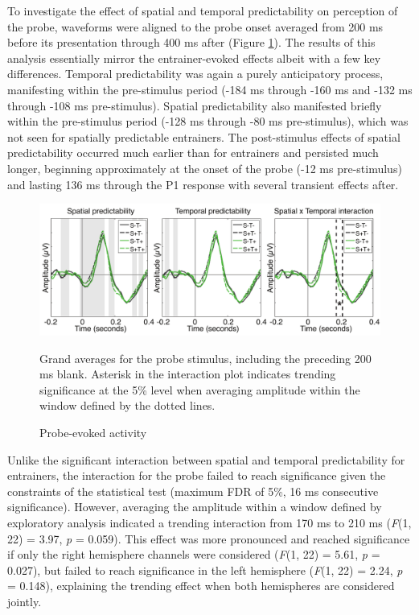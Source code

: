 \documentclass[dwyatte_dissertation.tex]{subfiles}
\begin{document}
To investigate the effect of spatial and temporal predictability on perception of the probe, waveforms were aligned to the probe onset averaged from 200 ms before its presentation through 400 ms after (Figure \ref{fig:pleast_probe_tla}). The results of this analysis essentially mirror the entrainer-evoked effects albeit with a few key differences. Temporal predictability was again a purely anticipatory process, manifesting within the pre-stimulus period (-184 ms through -160 ms and -132 ms through -108 ms pre-stimulus). Spatial predictability also manifested briefly within the pre-stimulus period (-128 ms through -80 ms pre-stimulus), which was not seen for spatially predictable entrainers. The post-stimulus effects of spatial predictability occurred much earlier than for entrainers and persisted much longer, beginning approximately at the onset of the probe (-12 ms pre-stimulus) and lasting 136 ms through the P1 response with several transient effects after.

\begin{figure}[h!]
\begin{center}
\includegraphics[width=160mm]{figs/chap_pleast/results_probe_tla_All_montage.pdf}
\end{center}
\caption{Probe-evoked activity}{Grand averages for the probe stimulus, including the preceding 200 ms blank. Asterisk in the interaction plot indicates trending significance at the 5\% level when averaging amplitude within the window defined by the dotted lines.}
\label{fig:pleast_probe_tla}
\end{figure}

Unlike the significant interaction between spatial and temporal predictability for entrainers, the interaction for the probe failed to reach significance given the constraints of the statistical test (maximum FDR of 5\%, 16 ms consecutive significance). However, averaging the amplitude within a window defined by exploratory analysis indicated a trending interaction from 170 ms to 210 ms (\textit{F}(1, 22) = 3.97, \textit{p} = 0.059). This effect was more pronounced and reached significance if only the right hemisphere channels were considered (\textit{F}(1, 22) = 5.61, \textit{p} = 0.027), but failed to reach significance in the left hemisphere (\textit{F}(1, 22) = 2.24, \textit{p} = 0.148), explaining the trending effect when both hemispheres are considered jointly.
\end{document}
